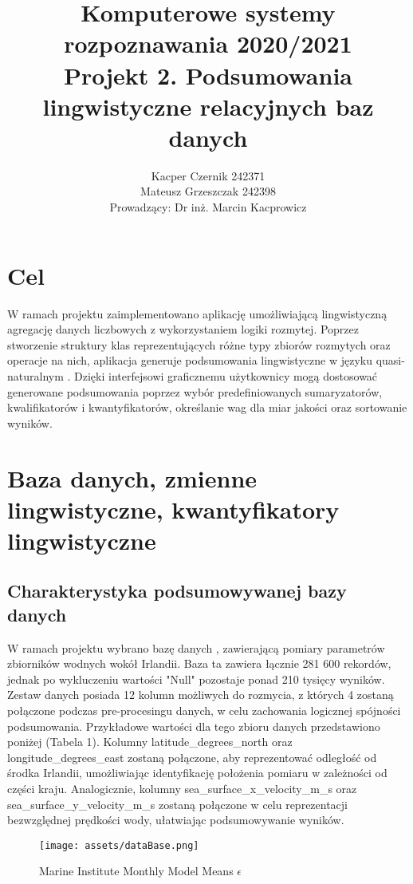 \documentclass{article}
\author{
	{Kacper Czernik 242371} \\
	{Mateusz Grzeszczak 242398}\\ 
{Prowadzący: Dr inż. Marcin Kacprowicz }
}
\title{Komputerowe systemy rozpoznawania 2020/2021\\Projekt 2. Podsumowania lingwistyczne relacyjnych baz danych}
\begin{document}
\maketitle

\section{Cel}
W ramach projektu zaimplementowano aplikację umożliwiającą lingwistyczną agregację danych liczbowych z wykorzystaniem logiki rozmytej. Poprzez stworzenie struktury klas reprezentujących różne typy zbiorów rozmytych oraz operacje na nich, aplikacja generuje podsumowania lingwistyczne w języku quasi-naturalnym \cite{zadrozny06}. Dzięki interfejsowi graficznemu użytkownicy mogą dostosować generowane podsumowania poprzez wybór predefiniowanych sumaryzatorów, kwalifikatorów i kwantyfikatorów, określanie wag dla miar jakości oraz sortowanie wyników.\\ 

\section{Baza danych, zmienne lingwistyczne, kwantyfikatory lingwistyczne}

\subsection{Charakterystyka podsumowywanej bazy danych}

W ramach projektu wybrano bazę danych \cite{dataBase}, zawierającą pomiary parametrów zbiorników wodnych wokół Irlandii. Baza ta zawiera łącznie 281 600 rekordów, jednak po wykluczeniu wartości "Null"  pozostaje ponad 210 tysięcy wyników. Zestaw danych posiada 12 kolumn możliwych do rozmycia, z których 4 zostaną połączone podczas pre-procesingu danych, w celu zachowania logicznej spójności podsumowania. Przykładowe wartości dla tego zbioru danych przedstawiono poniżej (Tabela 1). Kolumny latitude\_degrees\_north oraz longitude\_degrees\_east zostaną połączone, aby reprezentować odległość od środka Irlandii, umożliwiając identyfikację położenia pomiaru w zależności od części kraju. Analogicznie, kolumny sea\_surface\_x\_velocity\_m\_s oraz \\sea\_surface\_y\_velocity\_m\_s zostaną połączone w celu reprezentacji bezwzględnej prędkości wody, ułatwiając podsumowywanie wyników.

\begin{figure}[H]
\centering
\texttt{[image: assets/dataBase.png]}
\caption{Marine Institute Monthly Model Means $\epsilon$}
\label{fig:epsilon_bat}
\end{figure}
\end{document}
